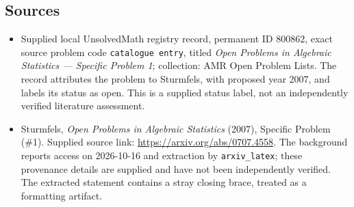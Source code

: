 \documentclass[11pt]{article}
\begin{document}
\subsection{Sources}
\begin{itemize}
\item Supplied local UnsolvedMath registry record, permanent ID \(800862\), exact source problem code \texttt{catalogue entry}, titled \emph{Open Problems in Algebraic Statistics --- Specific Problem 1}; collection: AMR Open Problem Lists. The record attributes the problem to Sturmfels, with proposed year 2007, and labels its status as open. This is a supplied status label, not an independently verified literature assessment.
\item Sturmfels, \emph{Open Problems in Algebraic Statistics} (2007), Specific Problem (\#1). Supplied source link: \url{https://arxiv.org/abs/0707.4558}. The background reports access on 2026-10-16 and extraction by \texttt{arxiv\_latex}; these provenance details are supplied and have not been independently verified. The extracted statement contains a stray closing brace, treated as a formatting artifact.
\end{itemize}
\end{document}
